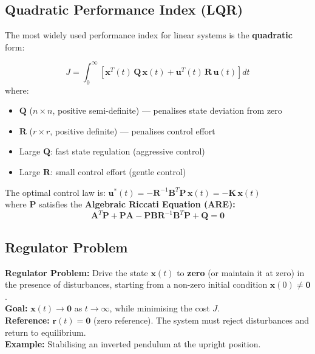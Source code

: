 \documentclass[12pt,a4paper]{article}
\begin{document}
\subsection{Quadratic Performance Index (LQR)}

The most widely used performance index for linear systems is the \textbf{quadratic} form:

\begin{tcolorbox}[formulabox, title={Quadratic Performance Index}]
$$J = \int_0^{\infty} \left[\mathbf{x}^T(t)\,\mathbf{Q}\,\mathbf{x}(t) + \mathbf{u}^T(t)\,\mathbf{R}\,\mathbf{u}(t)\right] dt$$
where:
\begin{itemize}[leftmargin=*, itemsep=2pt, topsep=2pt]
  \item $\mathbf{Q}$ ($n\times n$, positive semi-definite) --- penalises state deviation from zero
  \item $\mathbf{R}$ ($r\times r$, positive definite) --- penalises control effort
  \item Large $\mathbf{Q}$: fast state regulation (aggressive control)
  \item Large $\mathbf{R}$: small control effort (gentle control)
\end{itemize}
The optimal control law is: $\mathbf{u}^*(t) = -\mathbf{R}^{-1}\mathbf{B}^T\mathbf{P}\,\mathbf{x}(t) = -\mathbf{K}\,\mathbf{x}(t)$\\
where $\mathbf{P}$ satisfies the \textbf{Algebraic Riccati Equation (ARE):}
$$\mathbf{A}^T\mathbf{P} + \mathbf{P}\mathbf{A} - \mathbf{P}\mathbf{B}\mathbf{R}^{-1}\mathbf{B}^T\mathbf{P} + \mathbf{Q} = \mathbf{0}$$
\end{tcolorbox}

\subsection{Regulator Problem}

\begin{tcolorbox}[defbox]
\textbf{Regulator Problem:} Drive the state $\mathbf{x}(t)$ to \textbf{zero} (or maintain it at zero) in the presence of disturbances, starting from a non-zero initial condition $\mathbf{x}(0) \neq \mathbf{0}$.\\[4pt]
\textbf{Goal:} $\mathbf{x}(t) \to \mathbf{0}$ as $t \to \infty$, while minimising the cost $J$.\\[4pt]
\textbf{Reference:} $\mathbf{r}(t) = \mathbf{0}$ (zero reference). The system must reject disturbances and return to equilibrium.\\[4pt]
\textbf{Example:} Stabilising an inverted pendulum at the upright position.
\end{tcolorbox}
\end{document}
